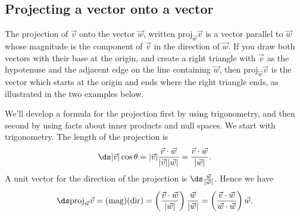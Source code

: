 \subsection{Projecting a vector onto a vector}
The projection of $\vec v$ onto the vector $\vec w$, written $\text{proj}_{\vec{w}}\vec{v}$ is a vector parallel to $\vec w$ whose magnitude is the component of $\vec v$ in the direction of $\vec w$.  If you draw both vectors with their base at the origin, and create a right triangle with $\vec v$ as the hypotenuse and the adjacent edge on the line containing $\vec w$, then $\text{proj}_{\vec{w}}\vec{v}$ is the vector which starts at the origin and ends where the right triangle ends, as illustrated in the two examples below.  	
\begin{center}	
\quad
{}
\end{center}
	
	
	
We'll develop a formula for the projection first by using trigonometry, and then second by using facts about inner products and null spaces.  
We start with trigonometry.  
The length of the projection is 
$$\ds|\vec v| \cos \theta = |\vec v|\frac{\vec v\cdot \vec w}{|\vec v||\vec w|} = \frac{\vec v\cdot \vec w}{|\vec w|}.$$ 
A unit vector for the direction of the projection is $\ds\frac{\vec w}{|\vec w|}$. 
Hence we have $$\ds\text{proj}_{\vec w}\vec v = (\text{mag})(\text{dir}) = \left(\frac{\vec v\cdot \vec w}{|\vec w|}\right)\frac{\vec w}{|\vec w|} = \left(\frac{\vec v\cdot \vec w}{\vec w\cdot \vec w}\right)\vec w .$$


